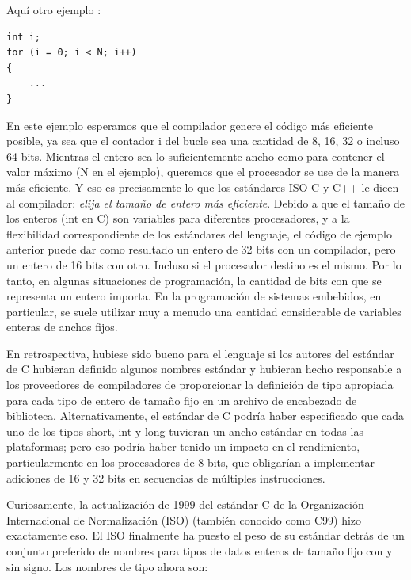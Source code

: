 \documentclass[output=paper, 
colorlinks,
citecolor=brown,
newtxmath
]{langscibook}
\begin{document}
Aquí otro ejemplo :

\begin{small}
\begin{verbatim}
int i;
for (i = 0; i < N; i++)
{
	...
}
\end{verbatim}
\end{small}

En este ejemplo esperamos que el compilador genere el código más eficiente posible, 
ya sea que el contador i del bucle sea una cantidad de 8, 16, 32 o incluso 64 bits.
Mientras el entero sea lo suficientemente ancho como para contener el valor máximo 
(N en el ejemplo), queremos que el procesador se use de la manera más eficiente. 
Y eso es precisamente lo que los estándares ISO C y C++ le dicen al compilador: 
\textit{elija el tamaño de entero más eficiente}. 
Debido a que el tamaño de los enteros (int en C) son variables para diferentes procesadores, 
y a la flexibilidad correspondiente de los estándares del lenguaje, 
el código de ejemplo anterior puede dar como resultado un entero de 32 bits 
con un compilador, pero un entero de 16 bits con otro. Incluso si el procesador destino es el mismo.
Por lo tanto, en algunas situaciones de programación, la cantidad de bits con que 
se representa un entero importa. 
En la programación de sistemas embebidos, en particular, se suele 
utilizar muy a menudo una cantidad considerable de variables enteras 
de anchos fijos.

En retrospectiva, hubiese sido bueno para el lenguaje si los autores del estándar de
C hubieran definido algunos nombres estándar y hubieran hecho responsable a 
los proveedores de compiladores de proporcionar la definición de tipo apropiada 
para cada tipo de entero de tamaño fijo en un archivo de encabezado de biblioteca. 
Alternativamente, el estándar de C podría haber especificado que cada uno de los 
tipos short, int y long tuvieran un ancho estándar en todas las plataformas; 
pero eso podría haber tenido un impacto en el rendimiento, 
particularmente en los procesadores de 8 bits, que obligarían a implementar 
adiciones de 16 y 32 bits en secuencias de múltiples instrucciones.

Curiosamente, la actualización de 1999 del estándar C de la Organización 
Internacional de Normalización (ISO) (también conocido como C99) 
hizo exactamente eso. El ISO finalmente ha puesto el peso de su 
estándar detrás de un conjunto preferido de nombres para tipos de datos 
enteros de tamaño fijo con y sin signo. Los nombres de tipo ahora son:
\end{document}
